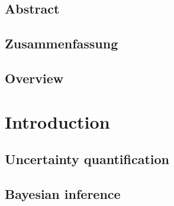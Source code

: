 \documentclass[a4paper,10pt,twoside]{book}                                                      %
\begin{document}
\frontmatter


\null\thispagestyle{allempty}                                                                   %

\chapter*{Abstract}


{\renewcommand{\cleardoublepage}{} \chapter*{Zusammenfassung}}                                  %


\renewcommand{\contentsname}{Table of contents}
\setcounter{tocdepth}{1}
\tableofcontents



\mainmatter

\chapter{Overview}


\part{Introduction} \label{sec:Introduction}

\chapter{Uncertainty quantification} \label{sec:Uncertainty}


\chapter{Bayesian inference} \label{sec:Bayesian}

\end{document}
